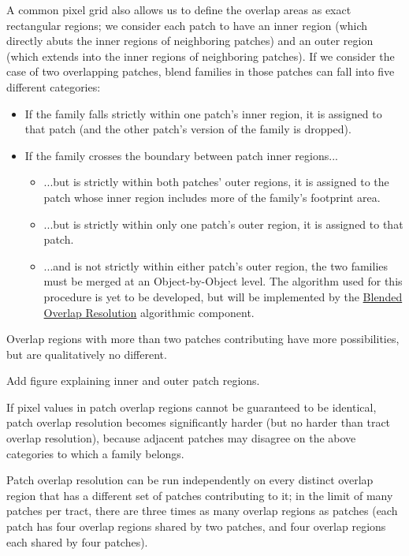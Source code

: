 A common pixel grid also allows us to define the overlap areas as exact rectangular regions; we consider each patch to have an inner region (which directly abuts the inner regions of neighboring patches) and an outer region (which extends into the inner regions of neighboring patches).  If we consider the case of two overlapping patches, blend families in those patches can fall into five different categories:
\begin{itemize}
\item If the family falls strictly within one patch's inner region, it is assigned to that patch (and the other patch's version of the family is dropped).
\item If the family crosses the boundary between patch inner regions...
  \begin{itemize}
  \item ...but is strictly within both patches' outer regions, it is assigned to the patch whose inner region includes more of the family's footprint area.
  \item ...but is strictly within only one patch's outer region, it is assigned to that patch.
  \item ...and is not strictly within either patch's outer region, the two families must be merged at an Object-by-Object level.  The algorithm used for this procedure is yet to be developed, but will be implemented by the \hyperref[sec:acBlendedOverlapResolution]{Blended Overlap Resolution} algorithmic component.
  \end{itemize}
\end{itemize}
Overlap regions with more than two patches contributing have more possibilities, but are qualitatively no different.

\begin{note}[TODO]
  Add figure explaining inner and outer patch regions.
\end{note}

If pixel values in patch overlap regions cannot be guaranteed to be identical, patch overlap resolution becomes significantly harder (but no harder than tract overlap resolution), because adjacent patches may disagree on the above categories to which a family belongs.

Patch overlap resolution can be run independently on every distinct overlap region that has a different set of patches contributing to it; in the limit of many patches per tract, there are three times as many overlap regions as patches (each patch has four overlap regions shared by two patches, and four overlap regions each shared by four patches).

